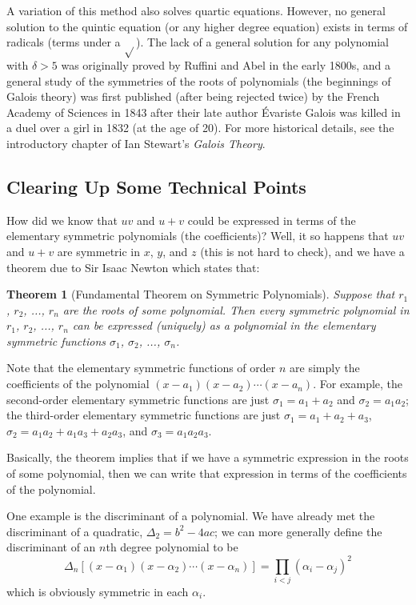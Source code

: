 \documentclass[a4paper,10pt,titlepage]{article}
\newtheorem*{thm}{Theorem}
\theoremstyle{definition}
\begin{document}
A variation of this method also solves quartic equations. However, no general solution to the
quintic equation (or any higher degree equation) exists in terms of radicals (terms under a $ \sqrt{} $).
The lack of a general solution for any polynomial with $ \delta > 5 $ was originally proved by Ruffini
and Abel in the early 1800s, and a general study of the symmetries of the roots of polynomials
(the beginnings of Galois theory) was first published (after being rejected twice) by the
French Academy of Sciences in 1843 after their late author \'Evariste Galois was killed in a duel
over a girl in 1832 (at the age of 20). For more historical details, see the introductory chapter
of Ian Stewart's \emph{Galois Theory}.

\subsection*{Clearing Up Some Technical Points}
How did we know that $ uv $ and $ u + v $ could be expressed in terms of the elementary
symmetric polynomials (the coefficients)? Well, it so happens that $ uv $ and $ u + v $ are
symmetric in $ x $, $ y $, and $ z $ (this is not hard to check), and we have a theorem due
to Sir Isaac Newton which states that:
\begin{thm}[Fundamental Theorem on Symmetric Polynomials]
  Suppose that $ r_1 $, $ r_2 $, ..., $ r_n $ are the roots of some polynomial. Then every
  symmetric polynomial in $ r_1 $, $ r_2 $, ..., $ r_n $ can be expressed (uniquely) as a polynomial
  in the elementary symmetric functions $ \sigma_1 $, $ \sigma_2 $, ..., $ \sigma_n $.
\end{thm}
Note that the elementary symmetric functions of order $ n $ are simply the coefficients of
the polynomial $ (x - a_1)(x - a_2) \cdots (x - a_n) $. For example, the second-order elementary
symmetric functions are just $ \sigma_1 = a_1 + a_2 $ and $ \sigma_2 = a_1 a_2 $; the third-order
elementary symmetric functions are just $ \sigma_1 = a_1 + a_2 + a_3 $, $ \sigma_2 = a_1 a_2 + a_1 a_3 + a_2 a_3 $,
and $ \sigma_3 = a_1 a_2 a_3 $.

Basically, the theorem implies that if we have a symmetric expression in the roots of some polynomial,
then we can write that expression in terms of the coefficients of the polynomial.

One example is the discriminant of a polynomial. We have already met the discriminant of a quadratic, $ \Delta_2 = b^2 - 4ac $;
we can more generally define the discriminant of an $ n$th degree polynomial to be
\begin{displaymath}
\Delta_n [(x - \alpha_1)(x - \alpha_2) \cdots (x - \alpha_n)] = \prod_{i < j}(\alpha_i - \alpha_j)^2
\end{displaymath}
which is obviously symmetric in each $ \alpha_i $.
\end{document}
